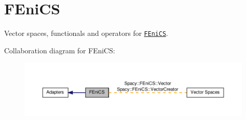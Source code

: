 \hypertarget{group__FenicsGroup}{\section{\-F\-Eni\-C\-S}
\label{group__FenicsGroup}
}


\-Vector spaces, functionals and operators for \href{http://www.fenicsproject.org}{\tt \-F\-Eni\-C\-S}.  


\-Collaboration diagram for \-F\-Eni\-C\-S\-:
\nopagebreak
\begin{figure}[H]
\begin{center}
\leavevmode
\includegraphics[width=350pt]{group__FenicsGroup}
\end{center}
\end{figure}
